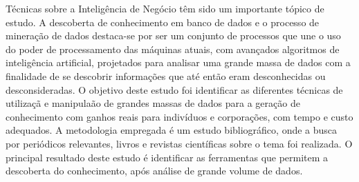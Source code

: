 
\begin{resumo}

T\'{e}cnicas sobre a Intelig\^{e}ncia de Neg\'{o}cio t\^{e}m sido um importante t\'{o}pico de estudo. A descoberta de conhecimento em banco de dados e o processo de minera\c{c}\~{a}o de dados destaca-se por ser um conjunto de processos que une o uso do poder de processamento das m\'{a}quinas atuais, com avan\c{c}ados algoritmos de intelig\^{e}ncia artificial, projetados para analisar uma grande massa de dados com a finalidade de se descobrir informa\c{c}\~{o}es que at\'{e} ent\~{a}o eram desconhecidas ou desconsideradas. O objetivo deste estudo foi identificar as diferentes t\'{e}cnicas de utiliza\c{c}\~{a} e manipula\~{a}o de grandes massas de dados para a gera\c{c}\~{a}o de conhecimento com ganhos reais para indiv\'{i}duos e corpora\c{c}\~{o}es, com tempo e custo adequados. A metodologia empregada \'{e} um estudo bibliogr\'{a}fico, onde a busca por peri\'{o}dicos relevantes, livros e revistas cient\'{i}ficas sobre o tema foi realizada. O principal resultado deste estudo \'{e} identificar as ferramentas que permitem a descoberta do conhecimento, ap\'{o}s an\'{a}lise de grande volume de dados.

\end{resumo}

